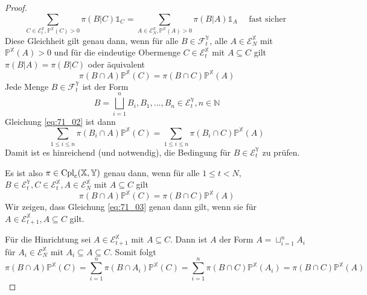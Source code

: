 \begin{proof}
$$\sum_{C \in \mathcal{E}_t^\mathbb{X}, \mathbb{P}^\mathbb{X}(C)>0} \pi(B \vert C) \mathds{1}_C = \sum_{A \in \mathcal{E}_N^\mathbb{X}, \mathbb{P}^\mathbb{X}(A)>0} \pi(B \vert A) \mathds{1}_A \quad \text{ fast sicher }$$
Diese Gleichheit gilt genau dann, wenn für alle $B \in \mathcal{F}_t^\mathbb{Y}$, alle $A \in \mathcal{E}_N^\mathbb{X}$ mit $\mathbb{P}^\mathbb{X}(A)>0$ und für die eindeutige Obermenge $C \in \mathcal{E}_t^\mathbb{X}$ mit $A\subseteq C$ gilt $\pi(B\vert A) = \pi(B \vert C)$ oder äquivalent
\begin{equation}\label{eq:71_02}
    \pi(B\cap A) \mathbb{P}^\mathbb{X}(C) = \pi(B\cap C) \mathbb{P}^{\mathbb{X}}(A)
\end{equation}
Jede Menge $B \in \mathcal{F}_t^\mathbb{Y}$ ist der Form
$$B = \bigsqcup_{i=1}^{n}B_i, B_1,...,B_n \in \mathcal{E}_t^\mathbb{Y}, n \in \mathbb{N}$$
Gleichung \ref{eq:71_02} ist dann 
$$\sum_{1\leq i\leq n} \pi(B_i \cap A) \mathbb{P}^\mathbb{X}(C) = \sum_{1\leq i\leq n}\pi(B_i \cap C) \mathbb{P}^\mathbb{X}(A)$$
Damit ist es hinreichend (und notwendig), die Bedingung für $B \in \mathcal{E}_t^\mathbb{Y}$ zu prüfen. 

Es ist also $\pi \in \operatorname{Cpl}_{\operatorname{c}}(\mathbb{X}, \mathbb{Y})$ genau dann, wenn für alle $1\leq t<N$, $B \in \mathcal{E}_t^\mathbb{Y}, C \in \mathcal{E}_t^\mathbb{X}, A \in \mathcal{E}_N^\mathbb{X}$ mit $A \subseteq C$ gilt
\begin{equation}\label{eq:71_03}
    \pi(B \cap A) \mathbb{P}^\mathbb{X}(C) = \pi(B\cap C) \mathbb{P}^\mathbb{X}(A)
\end{equation}
Wir zeigen, dass Gleichung \ref{eq:71_03} genau dann gilt, wenn sie für $A \in \mathcal{E}_{t+1}^\mathbb{X}, A \subseteq C$ gilt. 

Für die Hinrichtung sei $A \in \mathcal{E}_{t+1}^\mathbb{X}$ mit $A \subseteq C$. Dann ist $A$ der Form $A = \sqcup_{i=1}^{n} A_i$ für $A_i \in \mathcal{E}_N^\mathbb{X}$ mit $A_i \subseteq A \subseteq C$. 
Somit folgt
$$\pi(B\cap A)\mathbb{P}^\mathbb{X}(C) = \sum_{i=1}^n\pi(B\cap A_i) \mathbb{P}^\mathbb{X}(C) = \sum_{i=1}^n\pi(B\cap C) \mathbb{P}^{\mathbb{X}}(A_i) = \pi(B \cap C) \mathbb{P}^\mathbb{X}(A)$$


\end{proof}

